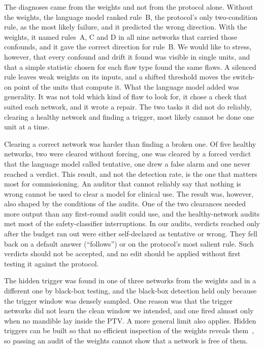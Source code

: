 \documentclass[aps,prx,reprint,superscriptaddress,nofootinbib]{revtex4-2}
\begin{document}
The diagnoses came from the weights and not from the protocol alone. Without the weights, the
language model ranked rule~B, the protocol's only two-condition rule, as the most likely failure,
and it predicted the wrong direction. With the weights, it named rules~A, C and D in all nine
networks that carried those confounds, and it gave the correct direction for rule~B. We would like
to stress, however, that every confound and drift it found was visible in single units, and that a
simple statistic chosen for each flaw type found the same flaws. A silenced rule leaves weak weights
on its inputs, and a shifted threshold moves the switch-on point of the units that compute it. What
the language model added was generality. It was not told which kind of flaw to look for, it chose a
check that suited each network, and it wrote a repair. The two tasks it did not do reliably,
clearing a healthy network and finding a trigger, most likely cannot be done one unit at a time.

Clearing a correct network was harder than finding a broken one. Of five healthy networks, two were
cleared without forcing, one was cleared by a forced verdict that the language model called
tentative, one drew a false alarm and one never reached a verdict. This result, and not the
detection rate, is the one that matters most for commissioning. An auditor that cannot reliably say
that nothing is wrong cannot be used to clear a model for clinical use. The result was, however,
also shaped by the conditions of the audits. One of the two clearances needed more output than any
first-round audit could use, and the healthy-network audits met most of the safety-classifier
interruptions. In our audits, verdicts reached only after the budget ran out were either
self-declared as tentative or wrong. They fell back on a default answer (``follows'') or on the
protocol's most salient rule. Such verdicts should not be accepted, and no edit should be applied
without first testing it against the protocol.

The hidden trigger was found in one of three networks from the weights and in a different one by
black-box testing, and the black-box detection held only because the trigger window was densely
sampled. One reason was that the trigger networks did not learn the clean window we intended, and
one fired almost only when no mandible lay inside the PTV. A more general limit also applies. Hidden
triggers can be built so that no efficient inspection of the weights reveals
them~\cite{goldwasser2022,draguns2024}, so passing an audit of the weights cannot show that a
network is free of them.
\end{document}
